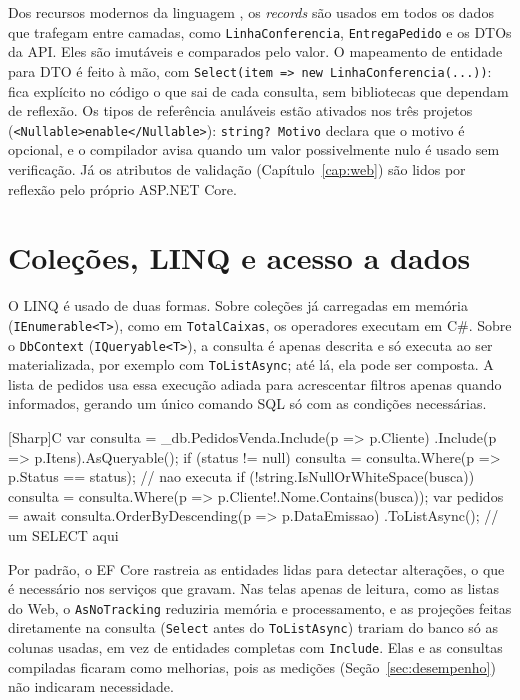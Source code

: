 Dos recursos modernos da linguagem \cite{deitel2017}, os \textit{records} são usados em todos os dados que trafegam entre camadas, como \texttt{LinhaConferencia}, \texttt{EntregaPedido} e os DTOs da API. Eles são imutáveis e comparados pelo valor. O mapeamento de entidade para DTO é feito à mão, com \texttt{Select(item => new LinhaConferencia(...))}: fica explícito no código o que sai de cada consulta, sem bibliotecas que dependam de reflexão. Os tipos de referência anuláveis estão ativados nos três projetos (\texttt{<Nullable>enable</Nullable>}): \texttt{string? Motivo} declara que o motivo é opcional, e o compilador avisa quando um valor possivelmente nulo é usado sem verificação. Já os atributos de validação (Capítulo~\ref{cap:web}) são lidos por reflexão pelo próprio ASP.NET Core.

\section{Coleções, LINQ e acesso a dados}

O LINQ é usado de duas formas. Sobre coleções já carregadas em memória (\texttt{IEnumerable<T>}), como em \texttt{TotalCaixas}, os operadores executam em C\#. Sobre o \texttt{DbContext} (\texttt{IQueryable<T>}), a consulta é apenas descrita e só executa ao ser materializada, por exemplo com \texttt{ToListAsync}; até lá, ela pode ser composta. A lista de pedidos usa essa execução adiada para acrescentar filtros apenas quando informados, gerando um único comando SQL só com as condições necessárias.

\begin{codeblock}{[Sharp]C}
var consulta = _db.PedidosVenda.Include(p => p.Cliente)
                              .Include(p => p.Itens).AsQueryable();
if (status != null)
    consulta = consulta.Where(p => p.Status == status); // nao executa
if (!string.IsNullOrWhiteSpace(busca))
    consulta = consulta.Where(p => p.Cliente!.Nome.Contains(busca));
var pedidos = await consulta.OrderByDescending(p => p.DataEmissao)
                            .ToListAsync();   // um SELECT aqui
\end{codeblock}

Por padrão, o EF Core rastreia as entidades lidas para detectar alterações, o que é necessário nos serviços que gravam. Nas telas apenas de leitura, como as listas do Web, o \texttt{AsNoTracking} reduziria memória e processamento, e as projeções feitas diretamente na consulta (\texttt{Select} antes do \texttt{ToListAsync}) trariam do banco só as colunas usadas, em vez de entidades completas com \texttt{Include}. Elas e as consultas compiladas ficaram como melhorias, pois as medições (Seção~\ref{sec:desempenho}) não indicaram necessidade.

